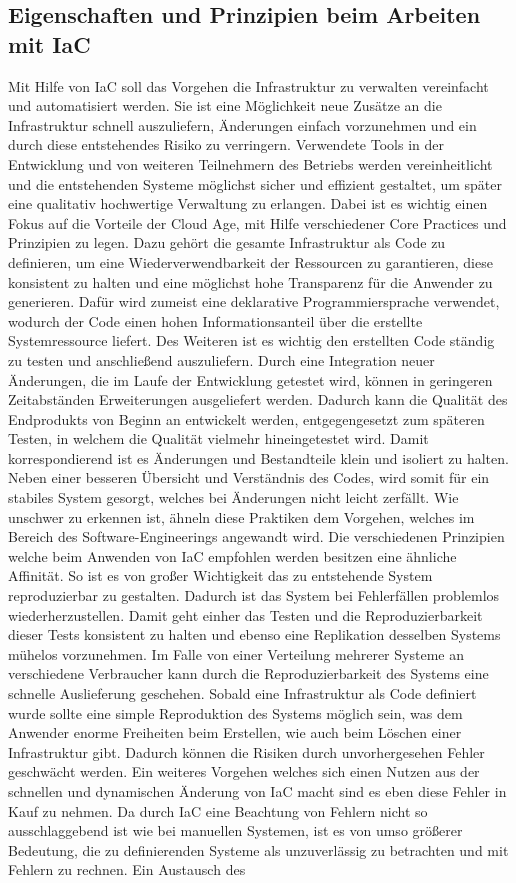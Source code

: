 \documentclass[biblatex]{lni}
\begin{document}
\subsection{Eigenschaften und Prinzipien beim Arbeiten mit IaC}
Mit Hilfe von IaC soll das Vorgehen die Infrastruktur zu verwalten vereinfacht und automatisiert werden. Sie ist eine Möglichkeit neue Zusätze an die Infrastruktur schnell auszuliefern, Änderungen einfach vorzunehmen und ein durch diese entstehendes Risiko zu verringern. Verwendete Tools in der Entwicklung und von weiteren Teilnehmern des Betriebs werden vereinheitlicht und die entstehenden Systeme möglichst sicher und effizient gestaltet, um später eine qualitativ hochwertige Verwaltung zu erlangen. Dabei ist es wichtig einen Fokus auf die Vorteile der Cloud Age, mit Hilfe verschiedener Core Practices und Prinzipien zu legen. Dazu gehört die gesamte Infrastruktur als Code zu definieren, um eine Wiederverwendbarkeit der Ressourcen zu garantieren, diese konsistent zu halten und eine möglichst hohe Transparenz für die Anwender zu generieren. Dafür wird zumeist eine deklarative Programmiersprache verwendet, wodurch der Code einen hohen Informationsanteil über die erstellte Systemressource liefert. Des Weiteren ist es wichtig den erstellten Code ständig zu testen und anschließend auszuliefern. Durch eine Integration neuer Änderungen, die im Laufe der Entwicklung getestet wird, können in geringeren Zeitabständen Erweiterungen ausgeliefert werden. Dadurch kann die Qualität des Endprodukts von Beginn an entwickelt werden, entgegengesetzt zum späteren Testen, in welchem die Qualität vielmehr \glqq hineingetestet\grqq{} wird. Damit korrespondierend ist es Änderungen und Bestandteile klein und isoliert zu halten. Neben einer besseren Übersicht und Verständnis des Codes, wird somit für ein stabiles System gesorgt, welches bei Änderungen nicht leicht zerfällt. Wie unschwer zu erkennen ist, ähneln diese Praktiken dem Vorgehen, welches im Bereich des Software-Engineerings angewandt wird. Die verschiedenen Prinzipien welche beim Anwenden von IaC empfohlen werden besitzen eine ähnliche Affinität. So ist es von großer Wichtigkeit das zu entstehende System reproduzierbar zu gestalten. Dadurch ist das System bei Fehlerfällen problemlos wiederherzustellen. Damit geht einher das Testen und die Reproduzierbarkeit dieser Tests konsistent zu halten und ebenso eine Replikation desselben Systems mühelos vorzunehmen. Im Falle von einer Verteilung mehrerer Systeme an verschiedene Verbraucher kann durch die Reproduzierbarkeit des Systems eine schnelle Auslieferung geschehen. Sobald eine Infrastruktur als Code definiert wurde sollte eine simple Reproduktion des Systems möglich sein, was dem Anwender enorme Freiheiten beim Erstellen, wie auch beim Löschen einer Infrastruktur gibt. Dadurch können die Risiken durch unvorhergesehen Fehler geschwächt werden. Ein weiteres Vorgehen welches sich einen Nutzen aus der schnellen und dynamischen Änderung von IaC macht sind es eben diese Fehler in Kauf zu nehmen. Da durch IaC eine Beachtung von Fehlern nicht so ausschlaggebend ist wie bei manuellen Systemen, ist es von umso größerer Bedeutung, die zu definierenden Systeme als unzuverlässig zu betrachten und mit Fehlern zu rechnen. Ein Austausch des 
\end{document}
